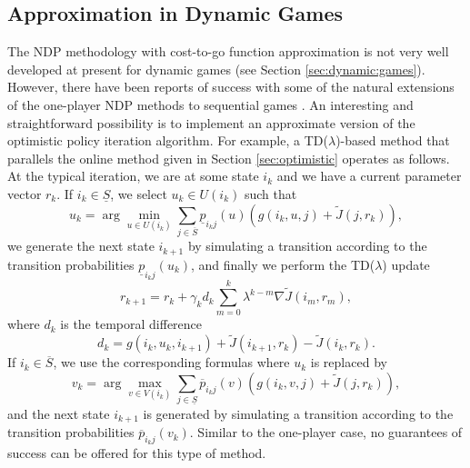 \subsection{Approximation in Dynamic Games}
The NDP methodology with cost-to-go function approximation is not very well developed at present for dynamic games (see Section \ref{sec:dynamic:games}). However, there have been reports of success with some of the natural extensions of the one-player NDP methods to sequential games \cite{lig*Tesauro95}. An interesting and straightforward possibility is to implement an approximate version of the optimistic policy iteration algorithm. For example, a TD($\lambda$)-based method that parallels the online method given in Section \ref{sec:optimistic} operates as follows. At the typical iteration, we are at some state $i_k$ and we have a current parameter vector $r_k$. If $i_k \in \underline S$, we select $u_k \in U(i_k)$ such that 
$$u_k = \arg \min_{u \in U(i_k)} \sum_{j \in \overline S} \underline p_{i_kj}(u) \left (g(i_k,u,j) + \tilde J(j,r_k) \right ),$$ 
we generate the next state $i_{k+1}$ by simulating a transition according to the transition probabilities $\underline p_{i_kj}(u_k)$, and finally we perform the TD($\lambda$) update
$$r_{k+1} = r_k +\gamma_k d_k \sum_{m=0}^k \lambda^{k-m} \nabla \tilde J(i_m,r_m),$$
where $d_k$ is the temporal difference 
$$d_k = g(i_k,u_k,i_{k+1}) + \tilde J(i_{k+1}, r_k) - \tilde J(i_k,r_k).$$
If $i_k \in \overline S$, we use the corresponding formulas where $u_k$ is replaced by 
$$ v_k = \arg \max_{v \in V(i_k)} \sum_{j \in \underline S } \overline p_{i_kj}(v) \left (g(i_k,v,j) + \tilde J(j,r_k) \right ),$$ 
and the next state $i_{k+1}$ is generated by simulating a transition according to the transition probabilities $\overline p_{i_kj}(v_k)$. Similar to the one-player case, no guarantees of success can be offered for this type of method.


